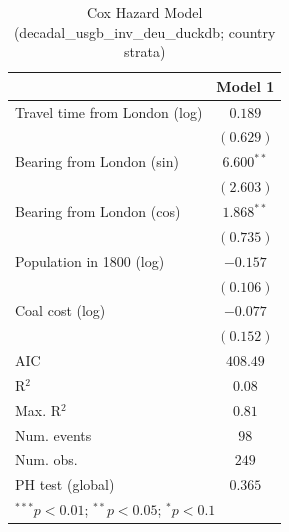 
\begin{table}
\begin{center}
\begin{tabular}{l c}
\hline
 & Model 1 \\
\hline
Travel time from London (log) & $0.189$ \\
 & $(0.629)$ \\
Bearing from London (sin) & $6.600^{**}$ \\
 & $(2.603)$ \\
Bearing from London (cos) & $1.868^{**}$ \\
 & $(0.735)$ \\
Population in 1800 (log) & $-0.157$ \\
 & $(0.106)$ \\
Coal cost (log) & $-0.077$ \\
 & $(0.152)$ \\
\hline
AIC              & $408.49$ \\
R$^2$            & $0.08$ \\
Max. R$^2$       & $0.81$ \\
Num. events      & $98$ \\
Num. obs.        & $249$ \\
PH test (global) & $0.365$ \\
\hline
\multicolumn{2}{l}{\scriptsize{$^{***}p<0.01$; $^{**}p<0.05$; $^{*}p<0.1$}}
\end{tabular}
\caption{Cox Hazard Model (decadal\_usgb\_inv\_deu\_duckdb; country strata)}
\label{tab:cox_serious_strata_decadal_usgb_inv_deu_duckdb}
\end{center}
\end{table}

